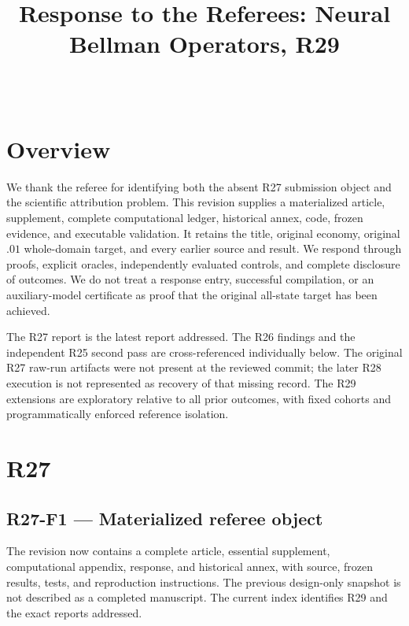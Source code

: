 

\begin{frontmatter}
\title{Response to the Referees: Neural Bellman Operators, R29}
\begin{aug}\author[id=au1,addressref={add1}]{~}\address[id=add1]{}\end{aug}
\end{frontmatter}
\section{Overview}
We thank the referee for identifying both the absent R27 submission object and the scientific attribution problem. This revision supplies a materialized article, supplement, complete computational ledger, historical annex, code, frozen evidence, and executable validation. It retains the title, original economy, original $.01$ whole-domain target, and every earlier source and result. We respond through proofs, explicit oracles, independently evaluated controls, and complete disclosure of outcomes. We do not treat a response entry, successful compilation, or an auxiliary-model certificate as proof that the original all-state target has been achieved.

The R27 report is the latest report addressed. The R26 findings and the independent R25 second pass are cross-referenced individually below. The original R27 raw-run artifacts were not present at the reviewed commit; the later R28 execution is not represented as recovery of that missing record. The R29 extensions are exploratory relative to all prior outcomes, with fixed cohorts and programmatically enforced reference isolation.
\section{R27}
\subsection{R27-F1 --- Materialized referee object}
The revision now contains a complete article, essential supplement, computational appendix, response, and historical annex, with source, frozen results, tests, and reproduction instructions. The previous design-only snapshot is not described as a completed manuscript. The current index identifies R29 and the exact reports addressed.

